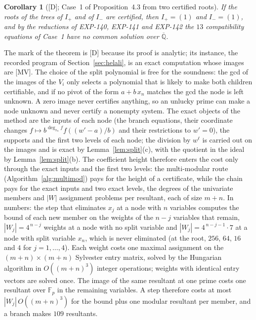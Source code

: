 \documentclass[11pt]{article}
\newtheorem{corollary}[theorem]{Corollary}
\theoremstyle{remark}
\newcommand{\Q}{\mathbb{Q}}
\begin{document}
\begin{corollary}[{[D]}; Case~1 of Proposition~4.3 from two certified roots]\label{cor:case1}
If the roots of the trees of $I_+$ and of $I_-$ are certified, then $I_+=(1)$ and $I_-=(1)$, and by the reductions of EXP-140, EXP-141 and EXP-142 the $13$ compatibility equations of Case~1 have no common solution over $\overline{\Q}$.
\end{corollary}

The mark of the theorem is [D] because its proof is analytic; its instance, the recorded program of Section~\ref{sec:helali}, is an exact computation whose images are [MV]. The choice of the split polynomial is free for the soundness: the gcd of the images of the $V_i$ only selects a polynomial that is likely to
make both children certifiable, and if no pivot of the form $a+b\,x_n$ matches the gcd the node is left unknown. A zero image never certifies anything, so an unlucky prime can make a node unknown and never certify a nonempty system. The exact objects of the method are the inputs of each node (the branch equations, their coordinate changes $f\mapsto b^{\deg_{x_n}f}f((w'-a)/b)$ and their restrictions to $w'=0$), the supports and the first two levels of each node; the division by $w^{\ell}$ is carried out on the images and is exact by Lemma~\ref{lem:split}(c), with the quotient in the ideal by Lemma~\ref{lem:split}(b). The coefficient height therefore enters the cost only through the exact inputs and the first two levels: the multi-modular route (Algorithm~\ref{alg:multimod}) pays for the height of a certificate, while the chain pays for the exact inputs and two exact levels, the degrees of the univariate members and $|W|$ assignment problems per resultant, each of size $m+n$.
In numbers: the step that eliminates $x_j$ at a node with $n$ variables computes the bound of each new member on the weights of the $n-j$ variables that remain, $|W_j|=4^{\,n-j}$ weights at a node with no split variable and $|W_j|=4^{\,n-j-1}\cdot7$ at a node with split variable $x_n$, which is never eliminated (at the root, $256$, $64$, $16$ and $4$ for $j=1,\dots,4$). Each weight costs one maximal assignment on the $(m+n)\times(m+n)$ Sylvester entry matrix, solved by the Hungarian algorithm in $O((m+n)^3)$ integer operations; weights with identical entry vectors are solved once. The image of the same resultant at one prime costs one resultant over $\mathbb F_p$ in the remaining variables. A step therefore costs at most $|W_j|\,O((m+n)^3)$ for the bound plus one modular resultant per member, and a branch makes $109$ resultants.
\end{document}

